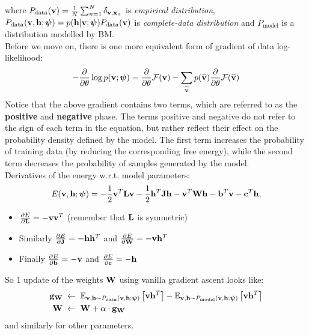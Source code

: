 where $P_{\text{data}}(\mathbf{v})=\frac{1}{N}\sum_{n=1}^N \delta_{\mathbf{v},\mathbf{x}_n}$ is \emph{empirical distribution}, $P_{\text{data}}(\mathbf{v},\mathbf{h};\boldsymbol{\psi})=p(\mathbf{h}|\mathbf{v};\boldsymbol{\psi})P_{\text{data}}(\mathbf{v})$ is \emph{complete-data distribution} and $P_{\text{model}}$ is a distribution modelled by BM.
\\[1em]
Before we move on, there is one more equivalent form of gradient of data log-likelihood:
\begin{gather}
-\frac{\partial}{\partial\theta}\log p(\mathbf{v};\boldsymbol{\psi})=\frac{\partial}{\partial\theta}\mathcal{F}(\mathbf{v})-\sum_{\mathbf{\widehat{v}}}p(\mathbf{\widehat{v}})\frac{\partial}{\partial\theta}\mathcal{F}(\mathbf{\widehat{v}})
\end{gather}
Notice that the above gradient contains two terms, which are referred to as the \textbf{positive} and \textbf{negative} phase. The terms positive and negative do not refer to the sign of each term in the equation, but rather reflect their effect on the probability density defined by the model. The first term increases the probability of training data (by reducing the corresponding free energy), while the second term decreases the probability of samples generated by the model.
\\[1em]
\u{Derivatives of the energy w.r.t. model parameters}:
$$
E(\mathbf{v},\mathbf{h};\boldsymbol{\psi})=-\frac{1}{2}\mathbf{v}^T\mathbf{L}\mathbf{v}-\frac{1}{2}\mathbf{h}^T\mathbf{J}\mathbf{h}-\mathbf{v}^T\mathbf{W}\mathbf{h}-\mathbf{b}^T\mathbf{v}-\mathbf{c}^T\mathbf{h},
$$
\begin{itemize}
\item $\frac{\partial E}{\partial \mathbf{L}}=-\mathbf{v}\mathbf{v}^T$ (remember that $\mathbf{L}$ is symmetric)
\item Similarly $\frac{\partial E}{\partial \mathbf{J}}=-\mathbf{h}\mathbf{h}^T$ and $\frac{\partial E}{\partial \mathbf{W}}=-\mathbf{v}\mathbf{h}^T$
\item Finally $\frac{\partial E}{\partial \mathbf{b}}=-\mathbf{v}$ and $\frac{\partial E}{\partial \mathbf{c}}=-\mathbf{h}$
\end{itemize}
So 1 update of the weights $\mathbf{W}$ using vanilla gradient ascent looks like:
\begin{align}
\mathbf{g}_{\mathbf{W}} &\;\leftarrow\; \mathbb{E}_{\mathbf{v},\mathbf{h}\sim P_{\text{data}}(\mathbf{v},\mathbf{h};\boldsymbol{\psi})}\left[\mathbf{v}\mathbf{h}^T\right]-\mathbb{E}_{\mathbf{v},\mathbf{h}\sim P_{\text{model}}(\mathbf{v},\mathbf{h};\boldsymbol{\psi})}\left[\mathbf{v}\mathbf{h}^T\right]
\\ 
\mathbf{W} &\;\leftarrow\; \mathbf{W} + \alpha\cdot\mathbf{g}_{\mathbf{W}}
\end{align}
and similarly for other parameters.
\\[1em]
